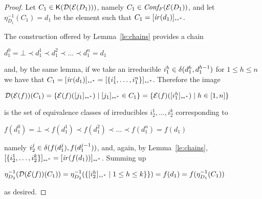\begin{proof}
  Let $C_1 \in \mathop{\mathsf{K}({\mathcal{D}({\mathcal{E}({D_1})})})}$, namely
  $C_1 \in \mathit{Conf_F}({\mathcal{E}({D_1})})$, and let $\eta_{D_1}^{-1}(C_1) = d_1$ be the
  element such that $C_1 = [{\mathop{\mathit{ir}({d_1})}}]_{\scriptscriptstyle {\leftrightarrow^*}}$.

  The construction offered by Lemma~\ref{le:chains} provides a chain
  \begin{center}
    ${d^0_1} = \bot \prec d_1^1 \prec d_1^2 \prec \ldots \prec d_1^n = d_1$
  \end{center}
  and, by the same lemma, if we take an irreducible $i_1^h \in
  \delta({d_1^h},{d_1^{h-1}})$ for $1 \leq h \leq n$ we have that
  $C_1 = [{\mathop{\mathit{ir}({d_1})}}]_{\scriptscriptstyle {\leftrightarrow^*}} = [{\{i_1^1, \ldots, i_1^n \}}]_{\scriptscriptstyle {\leftrightarrow^*}}$.
  Therefore the image
  \begin{center}
    $\mathcal{D}({\mathcal{E}({f})})(C_1) = \{ \mathcal{E}({f})([{j_1}]_{\scriptscriptstyle {\leftrightarrow^*}}) \mid
    [{j_1}]_{\scriptscriptstyle {\leftrightarrow^*}} \in C_1 \} = \{ \mathcal{E}({f})([{i_1^h}]_{\scriptscriptstyle {\leftrightarrow^*}}) \mid h
    \in [{1},{n}]\}$
  \end{center}
  is the set of equivalence classes of irreducibles
  $i_2^1, \ldots, i_2^k$ corresponding to 
  \begin{center}
    $f(d_1^0) = \bot \prec f(d_1^1) \prec f(d_1^2) \prec \ldots \prec
    f(d_1^n) = f(d_1)$
  \end{center}
  namely $i_2^j \in \delta({f(d_1^j)},{f(d_1^{j-1})})$, and,
  again, by Lemma~\ref{le:chains},
  $[{\{i_2^1, \ldots, i_2^k\}}]_{\scriptscriptstyle {\leftrightarrow^*}} = [{\mathop{\mathit{ir}({f(d_1)})}}]_{\scriptscriptstyle {\leftrightarrow^*}}$.
  Summing up
  \begin{center}
    $\eta_{D_2}^{-1}(\mathcal{D}({\mathcal{E}({f})})(C_1)) = \eta_{D_2}^{-1}(\{ [{i_2^h}]_{\scriptscriptstyle {\leftrightarrow^*}}
    \mid 1 \leq h \leq k \} \}) = f(d_1) = f(\eta_{D_1}^{-1}(C_1))$
  \end{center}
  as desired.



\end{proof}
